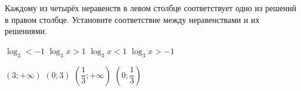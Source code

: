 \begin{class}[number=6]
\begin{listofex}
		\item Каждому из четырёх неравенств в левом столбце соответствует одно из решений в правом столбце. Установите соответствие между неравенствами и их решениями. \\
		\begin{minipage}[t]{\bodywidth}
			\begin{tasks}
				\task \( \log_3 < -1 \)
				\task \( \log_3 x > 1 \)
				\task \( \log_3 x < 1  \)
				\task \( \log_3 x > -1 \)
			\end{tasks}
		\end{minipage}
		\hspace{0.02\linewidth}
		\begin{minipage}[t]{\picwidth}
			\begin{tasks}
				\task \( (3; + \infty) \)
				\task \( (0;3) \)
				\task \( \left( \dfrac{ 1 }{ 3 }; + \infty \right) \)
				\task \( \left( 0; \dfrac{ 1 }{ 3 } \right) \)
			\end{tasks}
		\end{minipage}
		
	\end{listofex}
\end{class}

